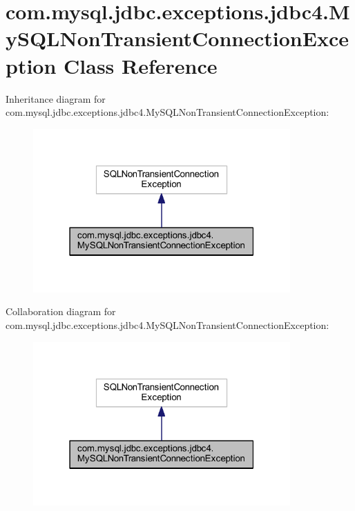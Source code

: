\hypertarget{classcom_1_1mysql_1_1jdbc_1_1exceptions_1_1jdbc4_1_1_my_s_q_l_non_transient_connection_exception}{}\section{com.\+mysql.\+jdbc.\+exceptions.\+jdbc4.\+My\+S\+Q\+L\+Non\+Transient\+Connection\+Exception Class Reference}
\label{classcom_1_1mysql_1_1jdbc_1_1exceptions_1_1jdbc4_1_1_my_s_q_l_non_transient_connection_exception}


Inheritance diagram for com.\+mysql.\+jdbc.\+exceptions.\+jdbc4.\+My\+S\+Q\+L\+Non\+Transient\+Connection\+Exception\+:
\nopagebreak
\begin{figure}[H]
\begin{center}
\leavevmode
\includegraphics[width=279pt]{classcom_1_1mysql_1_1jdbc_1_1exceptions_1_1jdbc4_1_1_my_s_q_l_non_transient_connection_exception__inherit__graph}
\end{center}
\end{figure}


Collaboration diagram for com.\+mysql.\+jdbc.\+exceptions.\+jdbc4.\+My\+S\+Q\+L\+Non\+Transient\+Connection\+Exception\+:
\nopagebreak
\begin{figure}[H]
\begin{center}
\leavevmode
\includegraphics[width=279pt]{classcom_1_1mysql_1_1jdbc_1_1exceptions_1_1jdbc4_1_1_my_s_q_l_non_transient_connection_exception__coll__graph}
\end{center}
\end{figure}
